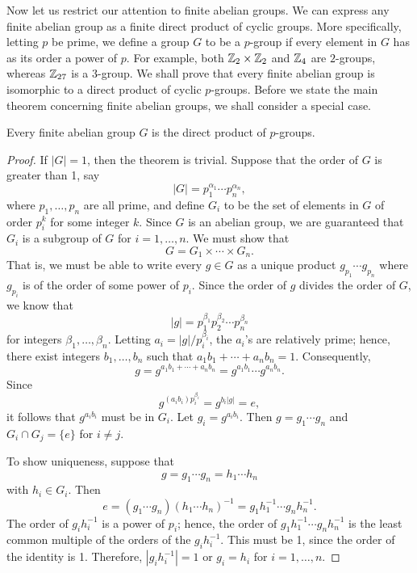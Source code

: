 \medskip
 
Now let us restrict our attention to finite abelian groups. We can
express any finite abelian group as a finite direct product of cyclic
groups. More specifically, letting $p$ be prime, we define a group $G$
to be a {\bfi $p$-group\/} if every element in 
$G$ has as its order a power of $p$. For example, both ${\Bbb Z}_2 
\times {\Bbb Z}_2$ and ${\Bbb Z}_4$ are $2$-groups, whereas 
${\Bbb Z}_{27}$ is a $3$-group. We shall prove that every finite 
abelian group is isomorphic to a direct product of cyclic $p$-groups. 
Before we  state the main theorem concerning finite abelian groups, we 
shall consider a special case.
 
 
\begin{theorem}
Every finite abelian group $G$ is the direct product of $p$-groups. 
\end{theorem}
 
 
\begin{proof}
If $|G|= 1$, then the theorem is trivial.  Suppose that the order of
$G$ is greater than 1, say 
\[
|G| = p_1^{\alpha_1} \cdots p_n^{\alpha_n},
\]
where $p_1, \ldots, p_n$ are all prime, and define $G_i$ to be the set
of elements in $G$ of order $p_i^k$ for some integer $k$. Since $G$ is
an abelian group, we are guaranteed that $G_i$ is a subgroup of $G$
for $i = 1, \ldots, n$. We must show that
\[
G = G_1 \times \cdots \times G_n.
\]
That is, we must be able to write every $g \in G$ as a unique product
$g_{p_1} \cdots g_{p_n}$ where $g_{p_i}$ is of the order of some power
of $p_i$. Since the order of $g$ divides the order of $G$, we know
that 
\[
|g| = p_1^{\beta_1}  p_2^{\beta_2} \cdots p_n^{\beta_n}
\]
for integers $\beta_1, \ldots, \beta_n$. Letting $a_i = |g| /
p_i^{\beta_i}$, the $a_i$'s are relatively prime; hence, there exist
integers $b_1, \ldots, b_n$ such that $a_1 b_1 + \cdots + a_n b_n =
1$. Consequently, 
\[
g = g^{a_1 b_1 + \cdots + a_n b_n} = g^{a_1 b_1} \cdots  g^{a_n b_n}. 
\]
Since
\[
g^{(a_i b_i ) p_i^{\beta_i}} = g^{b_i |g|} = e,
\]
it follows that $g^{a_i b_i}$ must be in $G_{i}$. Let $g_i =
g^{a_i b_i}$. Then $g = g_1 \cdots g_n$ and $G_i \cap G_j = \{ e \}$ for $i
\neq j$. 
 
 
To show uniqueness, suppose that 
\[
g = g_1 \cdots g_n = h_1 \cdots h_n
\]
with $h_i \in G_i$. Then
\[
e = (g_1 \cdots g_n)(h_1 \cdots h_n)^{-1} = g_1 h_1^{-1} \cdots g_n
h_n^{-1}. 
\]
The order of $g_i h_i^{-1}$ is a power of $p_i$; hence, the order of
$g_1 h_1^{-1} \cdots g_n h_n^{-1}$ is the least common multiple of the
orders of the $g_i h_i^{-1}$.  This must be 1, since the order of the
identity is 1. Therefore, $|g_i h_i^{-1}| =1$ or $g_i =h_i$ for $i =
1, \ldots, n$.
\mbox{\hspace{1in}}
\end{proof}
 
